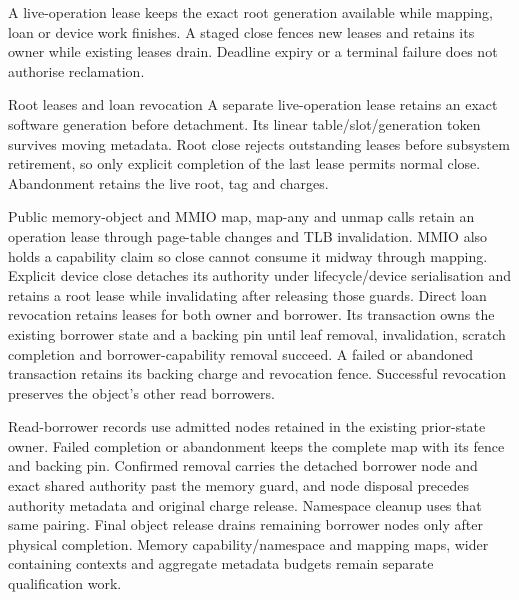 A live-operation lease keeps the exact root generation available while mapping,
loan or device work finishes. A staged close fences new leases and retains its
owner while existing leases drain. Deadline expiry or a terminal failure does
not authorise reclamation.

\begin{implementationdetail}{Root leases and loan revocation}
A separate live-operation lease retains an exact software generation before
detachment. Its linear table/slot/generation token survives moving metadata.
Root close rejects outstanding leases before subsystem retirement, so only explicit
completion of the last lease permits normal close. Abandonment retains the live
root, tag and charges.

Public memory-object and MMIO map, map-any and unmap calls retain an operation
lease through page-table changes and TLB invalidation. MMIO also holds a
capability claim so close cannot consume it midway through mapping. Explicit
device close detaches its authority under lifecycle/device serialisation and
retains a root lease while invalidating after releasing those guards. Direct
loan revocation retains leases for both owner and borrower. Its transaction owns
the existing borrower state and a backing pin until leaf removal, invalidation,
scratch completion and borrower-capability removal succeed. A failed or
abandoned transaction retains its backing charge and revocation fence.
Successful revocation preserves the object's other read borrowers.

Read-borrower records use admitted nodes retained in the existing prior-state
owner. Failed completion or abandonment keeps the complete map with its fence
and backing pin. Confirmed removal carries the detached borrower node and exact
shared authority past the memory guard, and node disposal precedes authority metadata
and original charge release. Namespace cleanup uses that same pairing. Final
object release drains remaining borrower nodes only after physical completion.
Memory capability/namespace and mapping maps, wider containing contexts and
aggregate metadata budgets remain separate qualification work.
\end{implementationdetail}


